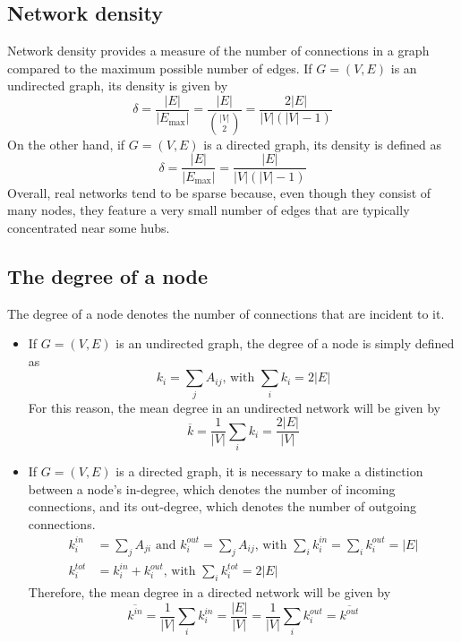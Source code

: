 \documentclass{report}
\begin{document}
\subsection{Network density}
Network density provides a measure of the number of connections in a graph compared to the maximum possible number of edges. \newline
If $\displaystyle G = (V, E)$ is an undirected graph, its density is given by
\[\delta = \frac{|E|}{|E_{\max}|} = \frac{|E|}{\binom{|V|}{2}} = \frac{2|E|}{|V|(|V| - 1)}\]
On the other hand, if $\displaystyle G = (V, E)$ is a directed graph, its density is defined as
\[\delta = \frac{|E|}{|E_{\max}|} = \frac{|E|}{|V|(|V| - 1)}\]
Overall, real networks tend to be sparse because, even though they consist of many nodes, they feature a very small number of edges that are typically concentrated near some hubs.
\subsection{The degree of a node}
The degree of a node denotes the number of connections that are incident to it.
\begin{itemize}
    \item If $\displaystyle G = (V, E)$ is an undirected graph, the degree of a node is simply defined as
    \[k_i = \sum_j A_{ij} \text{, with } \sum_i k_i = 2|E|\]
    For this reason, the mean degree in an undirected network will be given by
    \[\overline{k} = \frac{1}{|V|}\sum_i k_i = \frac{2|E|}{|V|}\]
    \item If $\displaystyle G = (V, E)$ is a directed graph, it is necessary to make a distinction between a node's in-degree, which denotes the number of incoming connections, and its out-degree, which denotes the number of outgoing connections.
    \begin{align*}
        k_i^{in} &= \sum_j A_{ji} \text{ and } k_i^{out} = \sum_j A_{ij} \text{, with } \sum_i k_i^{in} = \sum_i k_i^{out} = |E| \\
        k_i^{tot} &= k_i^{in} + k_i^{out} \text{, with } \sum_i k_i^{tot} = 2|E|
    \end{align*}
    Therefore, the mean degree in a directed network will be given by
    \[\overline{k^{in}} = \frac{1}{|V|}\sum_i k_i^{in} = \frac{|E|}{|V|} = \frac{1}{|V|}\sum_i k_i^{out} = \overline{k^{out}}\]
\end{itemize}
\end{document}
